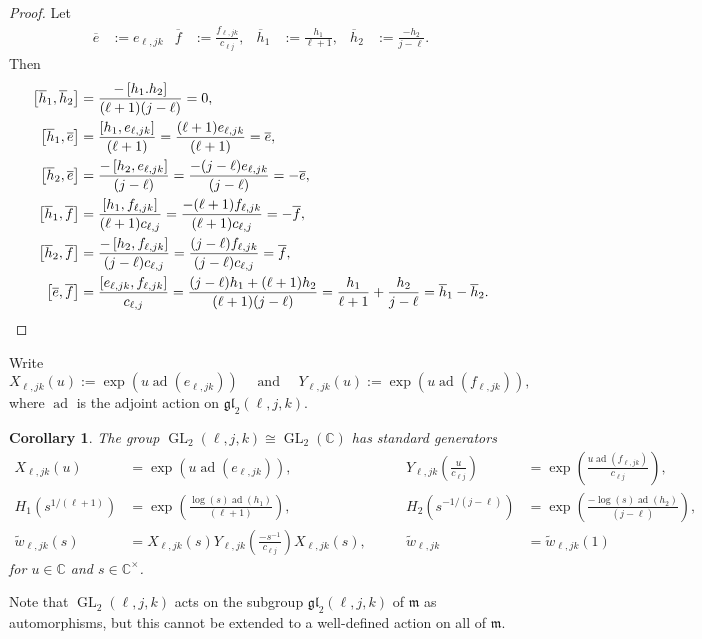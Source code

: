 \documentclass[11pt,letterpaper]{amsart}
\newcounter{thecounter}
\numberwithin{thecounter}{section}
\newtheorem{corollary}[thecounter]{Corollary}
\theoremstyle{definition}
\DeclareMathOperator{\GL}{GL}
\DeclareMathOperator{\ad}{ad}
\newcommand{\C}{{\mathbb C}}
\newcommand{\e}{\overline{e}}
\newcommand{\f}{\overline{f}}
\begin{document}
\begin{longver}
\begin{proof}  Let
\begin{align*}
 \overline{e}  &:= {e_{\ell,jk}}&
 \overline{f} &:= \frac{f_{\ell,jk}}{{c_{\ell j}}}, &
 \overline{h}_1 &:= \frac{h_1}{\ell+1},& 
 \overline{h}_2 &:=  \frac{-h_2}{j-\ell}.
\end{align*}
Then
\begin{align*}
 \left[\overline{h}_1,\overline{h}_2 \right] &= \frac{-\left[h_1.h_2 \right]}{(\ell+1)(j-\ell)}=0,\\
 \left[\overline{h}_1,\overline{e} \right] &=  \frac{\left[h_1,e_{\ell,jk} \right]}{(\ell+1)}   = \frac{(\ell+1)e_{\ell,jk}}{(\ell+1) }=\e,\\
 \left[\overline{h}_2,\overline{e} \right] &=  \frac{-\left[h_2,e_{\ell,jk} \right]}{(j-\ell)}   = \frac{-(j-\ell)e_{\ell,jk}}{(j-\ell) }=-\e,\\
 \left[\overline{h}_1,\overline{f} \right] &=  \frac{\left[h_1,f_{\ell,jk} \right]}{(\ell+1){c_{\ell,j}}}   = \frac{-(\ell+1)f_{\ell,jk}}{(\ell+1){c_{\ell,j}} }=-\f,\\
 \left[\overline{h}_2,\overline{f} \right] &=  \frac{-\left[h_2,f_{\ell,jk} \right]}{(j-\ell){c_{\ell,j}}}   = \frac{(j-\ell)f_{\ell,jk}}{(j-\ell){c_{\ell,j}} }=\f,\\ 
 \left[\overline{e},\overline{f} \right] &=  \frac{\left[e_{\ell,jk},f_{\ell,jk} \right]}{c_{\ell,j}}   =
 \frac{(j-\ell) h_1 +(\ell+1)h_2}{(\ell+1)(j-\ell)}=
 \frac{h_1}{\ell+1}+\frac{h_2}{j-\ell}=
  \overline{h}_1-\overline{h}_2.\qedhere
\end{align*}
\end{proof}
\end{longver}


Write
$$ X_{\ell,jk}\left(u\right) := \exp\left({u}\ad( e_{\ell,jk})\right) \quad\text{ and }\quad
 Y_{\ell,jk}\left(u\right) := \exp\left({u} \ad(f_{\ell,jk})\right),$$
where $\ad$ is the adjoint action on $\mathfrak{gl}_2(\ell,j,k)$.
\begin{corollary}
The group $\GL_2(\ell,j,k) \cong \GL_2(\C)$ has standard generators 
\begin{align*}
X_{\ell,jk}\left(u\right) &= \exp\left({u} \ad(e_{\ell,jk})\right),\qquad
&Y_{\ell,jk}\left(\frac{u}{{c_{\ell j}}}\right) &=\exp\left(\frac{u \ad(f_{\ell,jk})}{{c_{\ell j}}} \right) ,\\
H_1\left(s^{1/(\ell+1)}\right)&= \textstyle\exp \left(\frac{\log(s)\ad(h_1)}{(\ell+1)} \right),\;
&H_2\left(s^{-1/(j-\ell)}\right)&= \textstyle \exp \left(\frac{-\log(s)\ad(h_2)}{(j-\ell)} \right),\\
\widetilde{w}_{\ell,jk}(s) &=
 X_{\ell,jk}\left({s }\right) Y_{\ell,jk}\left(\frac{-s^{-1}}{{c_{\ell j}}}\right) 
X_{\ell,jk}\left({s}\right), \qquad &\widetilde{w}_{\ell,jk} &=\widetilde{w}_{\ell,jk}(1)
\end{align*}
for $u\in\C$ and $s\in\C^\times$.
\end{corollary}
Note that $\GL_2(\ell,j,k)$ acts on the subgroup $\mathfrak{gl}_2(\ell,j,k)$ of $\mathfrak{m}$ as automorphisms, but  this cannot be extended to a well-defined action on all of $\mathfrak{m}$. %
\end{document}
